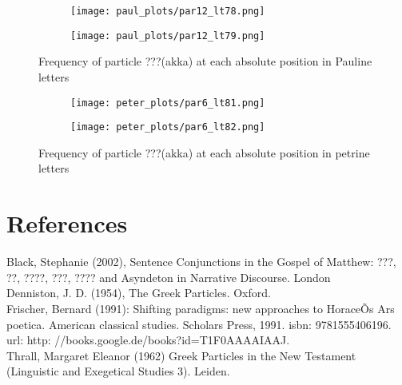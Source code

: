 \documentclass[a4paper]{article}
\begin{document}
\begin{figure}
\ContinuedFloat
\begin{subfigure}{0.45\textwidth}
\centering
\texttt{[image: paul\_plots/par12\_lt78.png]}
\end{subfigure}
\begin{subfigure}{0.45\textwidth}
\centering
\texttt{[image: paul\_plots/par12\_lt79.png]}
\end{subfigure}
\caption{Frequency of particle ???(akka) at each absolute position in Pauline letters}
\end{figure}

\begin{figure}
\begin{subfigure}{0.45\textwidth}
\centering
\texttt{[image: peter\_plots/par6\_lt81.png]}
\end{subfigure}
\begin{subfigure}{0.45\textwidth}
\centering
\texttt{[image: peter\_plots/par6\_lt82.png]}
\end{subfigure}
\caption{Frequency of particle ???(akka) at each absolute position in petrine letters}
\label{peter_akka}
\end{figure}


\section{References}
Black, Stephanie (2002), Sentence Conjunctions in the Gospel of Matthew: ???, ??, ????, ???, ???? and Asyndeton in Narrative Discourse. London \\

Denniston, J. D. (1954), The Greek Particles. Oxford. \\

Frischer, Bernard (1991): Shifting paradigms: new approaches to HoraceÕs Ars poetica. American classical studies. Scholars Press, 1991. isbn: 9781555406196. url: http: //books.google.de/books?id=T1F0AAAAIAAJ. \\ 

Thrall, Margaret Eleanor (1962) Greek Particles in the New Testament (Linguistic and Exegetical Studies 3). Leiden. \\
\end{document}
